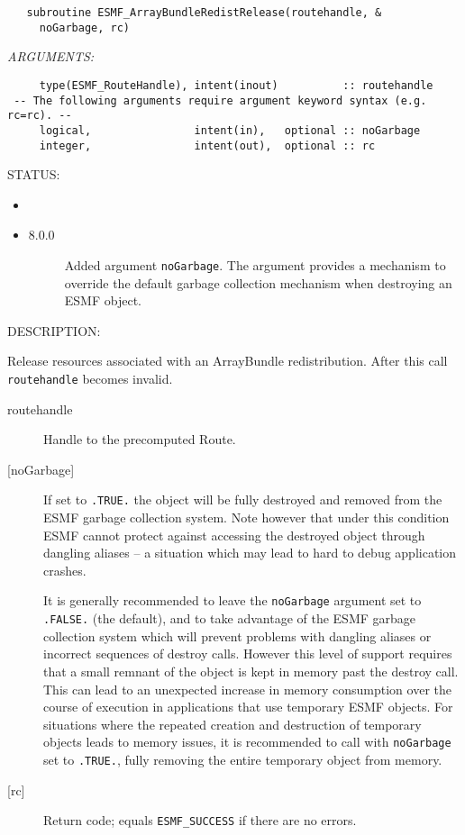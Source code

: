   
\begin{verbatim}   subroutine ESMF_ArrayBundleRedistRelease(routehandle, &
     noGarbage, rc)\end{verbatim}{\em ARGUMENTS:}
\begin{verbatim}     type(ESMF_RouteHandle), intent(inout)          :: routehandle
 -- The following arguments require argument keyword syntax (e.g. rc=rc). --
     logical,                intent(in),   optional :: noGarbage
     integer,                intent(out),  optional :: rc\end{verbatim}
{\sf STATUS:}
   \begin{itemize}
   \item{}
   \item{}
   \begin{description}
   \item[8.0.0] Added argument {\tt noGarbage}.
     The argument provides a mechanism to override the default garbage collection
     mechanism when destroying an ESMF object.
   \end{description}
   \end{itemize}
  
{\sf DESCRIPTION:\\ }


     Release resources associated with an ArrayBundle redistribution.
     After this call {\tt routehandle} becomes invalid.
  
     \begin{description}
     \item [routehandle]
       Handle to the precomputed Route.
     \item[{[noGarbage]}]
       If set to {\tt .TRUE.} the object will be fully destroyed and removed
       from the ESMF garbage collection system. Note however that under this 
       condition ESMF cannot protect against accessing the destroyed object 
       through dangling aliases -- a situation which may lead to hard to debug 
       application crashes.
   
       It is generally recommended to leave the {\tt noGarbage} argument
       set to {\tt .FALSE.} (the default), and to take advantage of the ESMF 
       garbage collection system which will prevent problems with dangling
       aliases or incorrect sequences of destroy calls. However this level of
       support requires that a small remnant of the object is kept in memory
       past the destroy call. This can lead to an unexpected increase in memory
       consumption over the course of execution in applications that use 
       temporary ESMF objects. For situations where the repeated creation and 
       destruction of temporary objects leads to memory issues, it is 
       recommended to call with {\tt noGarbage} set to {\tt .TRUE.}, fully 
       removing the entire temporary object from memory.
     \item [{[rc]}]
       Return code; equals {\tt ESMF\_SUCCESS} if there are no errors.
     \end{description}
   
